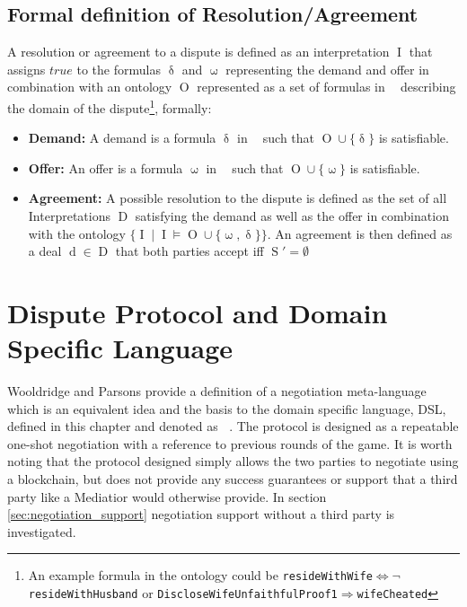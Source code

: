 \documentclass[12pt,msc,a4paper,oneside]{ucl_thesis}
\DeclareMathOperator{\Metalang}{\mathcal{L}_m}
\DeclareMathOperator{\Proplang}{\mathcal{L}(N)}
\DeclareMathOperator{\Interpretation}{I}
\DeclareMathOperator{\Ontology}{O}
\DeclareMathOperator{\Deal}{D}
\DeclareMathOperator{\deal}{d}
\DeclareMathOperator{\demand}{\delta}
\DeclareMathOperator{\offer}{\omega}
\DeclareMathOperator{\Statement}{S}
\begin{document}
\subsection{Formal definition of Resolution/Agreement} \label{sec:agreement}
A resolution or agreement to a dispute is defined as an interpretation $\Interpretation$ that assigns $true$ to the formulas $\demand$ and $\offer$ representing the demand and offer in combination with an ontology $\Ontology$ represented as a set of formulas in $\Proplang$ describing the domain of the dispute\footnote{An example formula in the ontology could be \texttt{resideWithWife$\Leftrightarrow\neg$resideWithHusband} or \texttt{DiscloseWifeUnfaithfulProof1$\Rightarrow$wifeCheated}}, formally\cite{Ragone2008}:
\begin{itemize}
    \item \textbf{Demand:} A demand is a formula $\demand$ in $\Proplang$ such that $\Ontology \cup \{\demand\}$ is satisfiable.
    \item \textbf{Offer:} An offer is a formula $\offer$ in $\Proplang$ such that $\Ontology \cup \{\offer\}$ is satisfiable.
    \item \textbf{Agreement:} A possible resolution to the dispute is defined as the set of all Interpretations $\Deal$ satisfying the demand as well as the offer in combination with the ontology $\{\Interpretation \mid \Interpretation \models \Ontology \cup \{\offer, \demand\}\}$. An agreement is then defined as a deal $\deal \in \Deal$ that both parties accept iff $\Statement' = \emptyset$
\end{itemize}


\section{Dispute Protocol and Domain Specific Language}
Wooldridge and Parsons \cite{Wooldridge:2000:LN:3006433.3006516} provide a definition of a negotiation meta-language which is an equivalent idea and the basis to the domain specific language, DSL, defined in this chapter and denoted as $\Metalang$. The protocol is designed as a repeatable one-shot negotiation with a reference to previous rounds of the game. It is worth noting that the protocol designed simply allows the two parties to negotiate using a blockchain, but does not provide any success guarantees or support that a third party like a Mediatior would otherwise provide. In section \ref{sec:negotiation_support} negotiation support without a third party is investigated.
\end{document}
